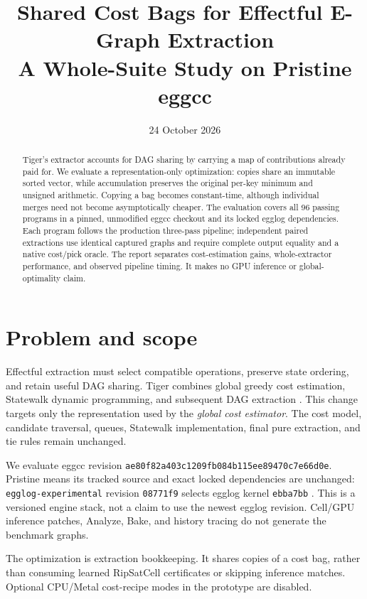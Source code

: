\documentclass[10pt,a4paper]{article}
\title{\textbf{Shared Cost Bags for Effectful E-Graph Extraction}\\[4pt]
\large A Whole-Suite Study on Pristine eggcc}
\author{}\date{24 October 2026}
\newcommand{\tool}[1]{\texttt{#1}}
\begin{document}
\maketitle\vspace{-2em}
\begin{abstract}
Tiger's extractor accounts for DAG sharing by carrying a map of contributions
already paid for. We evaluate a representation-only optimization: copies share
an immutable sorted vector, while accumulation preserves the original per-key
minimum and unsigned arithmetic. Copying a bag becomes constant-time, although
individual merges need not become asymptotically cheaper. The evaluation covers
all 96 passing programs in a pinned, unmodified eggcc checkout and its locked
egglog dependencies. Each program follows the production three-pass pipeline;
independent paired extractions use identical captured graphs and require complete
output equality and a native cost/pick oracle.
The report separates cost-estimation gains, whole-extractor performance, and
observed pipeline timing. It makes no GPU inference or global-optimality claim.
\end{abstract}

\section{Problem and scope}
Effectful extraction must select compatible operations, preserve state ordering,
and retain useful DAG sharing. Tiger combines global greedy cost estimation,
Statewalk dynamic programming, and subsequent DAG extraction \cite{eggcc}.
This change targets only the representation used by the \emph{global cost
estimator}. The cost model, candidate traversal, queues, Statewalk implementation,
final pure extraction, and tie rules remain unchanged.

We evaluate eggcc revision \texttt{ae80f82a403c1209fb084b115ee89470c7e66d0e}.
Pristine means its tracked source and exact locked dependencies are unchanged:
\tool{egglog-experimental} revision \texttt{08771f9} selects egglog kernel
\texttt{ebba7bb} \cite{experimental,engine}. This is a versioned engine stack,
not a claim to use the newest egglog revision. Cell/GPU inference patches,
Analyze, Bake, and history tracing do not generate the benchmark graphs.

The optimization is extraction bookkeeping. It shares copies of a cost bag,
rather than consuming learned RipSatCell certificates or skipping inference
matches. Optional CPU/Metal cost-recipe modes in the prototype are disabled.
\end{document}
